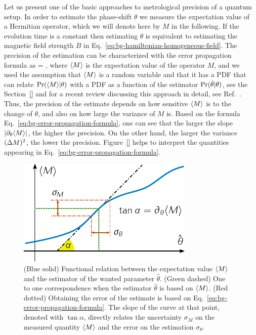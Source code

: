 Let us present one of the basic approaches to metrological precision of a quantum setup.
In order to estimate the phase-shift $\theta$ we measure the expectation value of a Hermitian operator, which we will denote here by $M$ in the following.
If the evolution time is a constant then estimating $\theta$ is equivalent to estimating the magnetic field strength $B$ in Eq.~\eqref{eq:bg-hamiltonian-homogeneous-field}.
The precision of the estimation can be characterized with the error propagation formula as
\be
  \label{eq:bg-error-propagation-formula}
  \varian{\theta} = ,
\ee
where $\langle M \rangle$ is the expectation value of the operator $M$, and we used the assumption that $\langle M \rangle$ is a random variable and that it has a PDF that can relate $\text{Pr}(\langle M \rangle|\theta)$ with a PDF as a function of the estimator $\text{Pr}(\hat{\theta}|\theta)$, see the Section~\ref{} and for a recent review discussing this approach in detail, see Ref.~\citep{MR38}.
Thus, the precision of the estimate depends on how sensitive $\langle M \rangle$ is to the change of $\theta$, and also on how large the variance of $M$ is.
Based on the formula Eq.~\eqref{eq:bg-error-propagation-formula}, one can see that the larger the slope $|\partial_\theta \langle M \rangle|$, the higher the precision.
On the other hand, the larger the variance $(\Delta M )^2$, the lower the precision.
Figure~\ref{} helps to interpret the quantities appearing in Eq.~\eqref{eq:bg-error-propagation-formula}.
\begin{figure}[htp]
  \centering
  \includegraphics[scale=1.2]{img/BG_expect_m_evo.pdf}
  \caption[Graphical explanation of the error-propagation formula]{(Blue solid) Functional relation between the expectation value $\langle M \rangle$ and the estimator of the wanted parameter $\hat\theta$.
  (Green dashed) One to one correspondence when the estimator $\hat{\theta}$ is based on $\langle M \rangle$. (Red dotted) Obtaining the error of the estimate is based on Eq.~\eqref{eq:bg-error-propagation-formula}.
  The slope of the curve at that point, denoted with $\tan\alpha$, directly relates the uncertainty $\sigma_M$ on the measured quantity $\langle M \rangle$ and the error on the estimation $\sigma_\theta$.}
  \label{fig:bg-expect-m-evo}
\end{figure}


